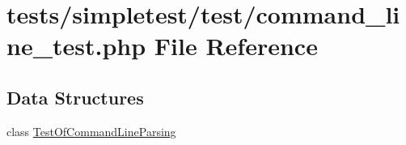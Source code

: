 \hypertarget{command__line__test_8php}{\section{tests/simpletest/test/command\-\_\-line\-\_\-test.php File Reference}
\label{command__line__test_8php}
}
\subsection*{Data Structures}
\begin{DoxyCompactItemize}
\item 
class \hyperlink{class_test_of_command_line_parsing}{Test\-Of\-Command\-Line\-Parsing}
\end{DoxyCompactItemize}
